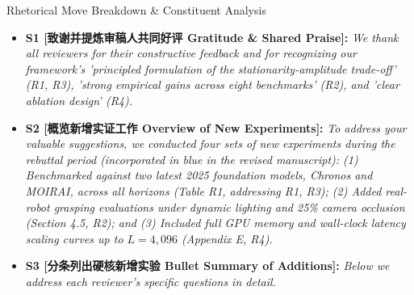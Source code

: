 \begin{TipBox}{Rhetorical Move Breakdown \& Constituent Analysis}
\begin{itemize}[leftmargin=1.5em]
  \item \textbf{S1 [致谢并提炼审稿人共同好评 Gratitude \& Shared Praise]:} \textit{We thank all reviewers for their constructive feedback and for recognizing our framework's 'principled formulation of the stationarity-amplitude trade-off' (R1, R3), 'strong empirical gains across eight benchmarks' (R2), and 'clear ablation design' (R4).}\par{}
  \item \textbf{S2 [概览新增实证工作 Overview of New Experiments]:} \textit{To address your valuable suggestions, we conducted four sets of new experiments during the rebuttal period (incorporated in blue in the revised manuscript): (1) Benchmarked against two latest 2025 foundation models, Chronos and MOIRAI, across all horizons (Table R1, addressing R1, R3); (2) Added real-robot grasping evaluations under dynamic lighting and 25\% camera occlusion (Section 4.5, R2); and (3) Included full GPU memory and wall-clock latency scaling curves up to $L=4,096$ (Appendix E, R4).}\par{}
  \item \textbf{S3 [分条列出硬核新增实验 Bullet Summary of Additions]:} \textit{Below we address each reviewer's specific questions in detail.}\par{}
\end{itemize}
\end{TipBox}
\medskip
